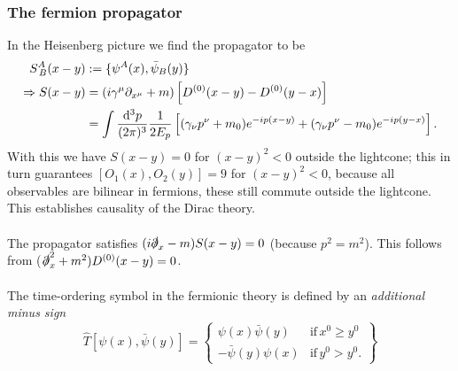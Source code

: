 \begin{enumerate}
\end{enumerate}

\subsubsection{The fermion propagator}
In the Heisenberg picture we find the propagator to be
\begin{align}
	S^A_{\,B}(x-y) &:= \{\psi^A(x), \bar{\psi}_B(y) \} \\
	\Rightarrow S(x-y) &= (i \gamma^{\mu} \partial_{x^{\mu}}+m) \left[D^{(0)}(x-y) - D^{(0)}(y-x) \right]\\
	&= \int \frac{\mathrm{d}^3 p}{(2 \pi)^3} \frac{1}{2 E_p} \left[(\gamma_{\nu} p^{\nu} +m_0) e^{-ip(x-y)} + (\gamma_{\nu}p^{\nu} -m_0) e^{-ip(y-x)}  \right].
\end{align}
With this we have $S(x-y)=0$ for $(x-y)^2<0$ outside the lightcone; this in turn guarantees $[O_1(x),O_2(y)]=9$ for $(x-y)^2<0$, because all observables are bilinear in fermions, these still commute outside the lightcone. This establishes causality of the Dirac theory.\\
\\ The propagator satisfies $(i \slashed{\partial}_x -m)S(x-y)=0$ (because $p^2=m^2$). This follows from ($\slashed{\partial}^2_x + m^2) D^{(0)}(x-y) =0$.
\\
\\ The time-ordering symbol in the fermionic theory is defined by an \emph{additional minus sign}
\begin{equation}
	\hat{T}[\psi(x),\bar{\psi}(y)] = \left\{\begin{array}{lr}
	\psi(x)\bar{\psi}(y) & \mathrm{if} \, x^0 \geq y^0\\
	-\bar{\psi}(y) \psi(x) & \mathrm{if} \, y^0 > y^0.
	\end{array}		\right\}
\end{equation}
